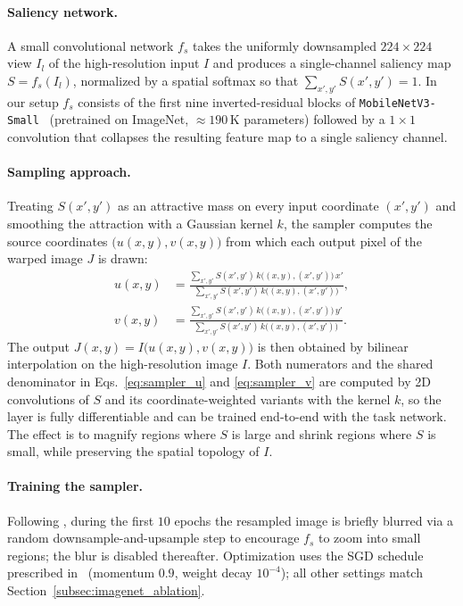 \documentclass[11pt]{article}
\begin{document}
\paragraph{Saliency network.}
A small convolutional network $f_{s}$ takes the uniformly downsampled
$224\times224$ view $I_{l}$ of the high-resolution input $I$ and produces a
single-channel saliency map $S=f_{s}(I_{l})$, normalized by a spatial softmax
so that $\sum_{x',y'} S(x',y')=1$.  In our setup $f_{s}$ consists of the first nine inverted-residual blocks
of \texttt{MobileNetV3-Small}~\cite{howard2019mobilenetv3} (pretrained on
ImageNet, $\approx 190$\,K parameters) followed by a $1\times1$
convolution that collapses the resulting feature map to a single
saliency channel.

\paragraph{Sampling approach.}
Treating $S(x',y')$ as an attractive mass on every input coordinate
$(x',y')$ and smoothing the attraction with a Gaussian kernel $k$, the
sampler computes the source coordinates $\bigl(u(x,y),v(x,y)\bigr)$ from
which each output pixel of the warped image $J$ is drawn:
\begin{align}
u(x,y) &= \frac{\displaystyle\sum_{x',y'} S(x',y')\,k\!\bigl((x,y),(x',y')\bigr)\,x'}
              {\displaystyle\sum_{x',y'} S(x',y')\,k\!\bigl((x,y),(x',y')\bigr)},
\label{eq:sampler_u}\\
v(x,y) &= \frac{\displaystyle\sum_{x',y'} S(x',y')\,k\!\bigl((x,y),(x',y')\bigr)\,y'}
              {\displaystyle\sum_{x',y'} S(x',y')\,k\!\bigl((x,y),(x',y')\bigr)}.
\label{eq:sampler_v}
\end{align}
The output $J(x,y)=I\!\bigl(u(x,y),v(x,y)\bigr)$ is then obtained by
bilinear interpolation on the high-resolution image $I$.  Both numerators
and the shared denominator in
Eqs.~\eqref{eq:sampler_u} and \eqref{eq:sampler_v} are computed by 2D
convolutions of $S$ and its coordinate-weighted variants with the kernel
$k$, so the layer is fully differentiable and can be trained end-to-end
with the task network.  The effect is to magnify regions where $S$ is large
and shrink regions where $S$ is small, while preserving the spatial topology
of $I$.

\paragraph{Training the sampler.}
Following \cite{recasens2018learning}, during the first $10$ epochs the
resampled image is briefly blurred via a random downsample-and-upsample
step to encourage $f_{s}$ to zoom into small regions; the blur is disabled
thereafter.  Optimization uses the SGD schedule prescribed
in~\cite{recasens2018learning} (momentum $0.9$, weight decay $10^{-4}$);
all other settings match Section~\ref{subsec:imagenet_ablation}.
\end{document}
